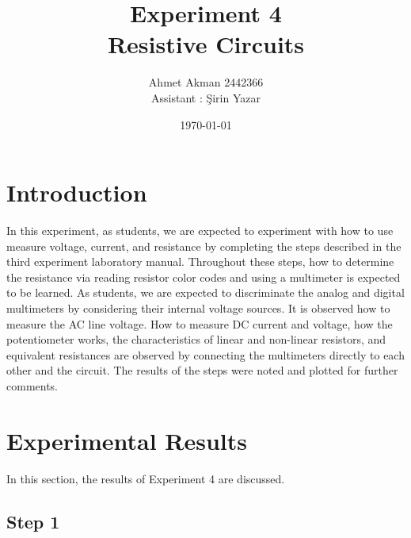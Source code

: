 \documentclass[letterpaper,12pt]{article}
\begin{document}
\title{Experiment 4 \protect\\Resistive Circuits}
\author{Ahmet Akman 2442366 \protect\\ Assistant : Şirin Yazar}
\date{\today}
\maketitle


\section{Introduction} 
In this experiment, as students, we are expected to experiment with how to use measure voltage, current, and resistance by completing the steps described in the third experiment laboratory manual. Throughout these steps, how to determine the resistance via reading resistor color codes and using a multimeter is expected to be learned. As students, we are expected to discriminate the analog and digital multimeters by considering their internal voltage sources. It is observed how to measure the AC line voltage. How to measure DC current and voltage, how the potentiometer works, the characteristics of linear and non-linear resistors, and equivalent resistances are observed by connecting the multimeters directly to each other and the circuit. The results of the steps were noted and plotted for further comments.
\section{Experimental Results}
In this section, the results of Experiment 4 are discussed.
\subsection{Step 1}
\end{document}
